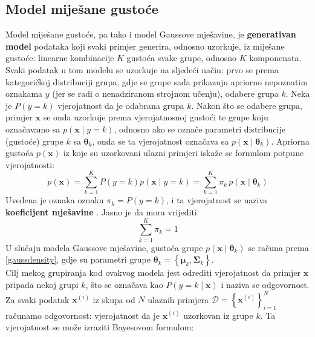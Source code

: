 \documentclass[times, utf8, zavrsni]{fer}
\begin{document}
\subsection{Model miješane gustoće}
Model miješane gustoće, pa tako i model Gaussove mješavine, je \textbf{generativan model} podataka koji svaki primjer generira, odnosno uzorkuje, iz miješane gustoće: linearne kombinacije $K$ gustoća svake grupe, odnosno $K$ komponenata. Svaki podatak u tom modelu se uzorkuje na sljedeći način: prvo se prema kategoričkoj distribuciji grupa, gdje se grupe sada prikazuju apriorno nepoznatim oznakama $y$ (jer se radi o nenadziranom strojnom učenju), odabere grupa $k$. Neka je $P \left(y = k\right)$ vjerojatnost da je odabrana grupa $k$. Nakon što se odabere grupa, primjer $\mathbf{x}$ se onda uzorkuje prema vjerojatnosnoj gustoći te grupe koju označavamo sa $p \left(\mathbf{x} \middle| y = k\right)$, odnosno ako se označe parametri distribucije (gustoće) grupe $k$ sa $\boldsymbol{\theta}_k$, onda se ta vjerojatnost označava sa $p \left(\mathbf{x} \middle| \boldsymbol{\theta}_k\right)$. Apriorna gustoća $p \left(\mathbf{x}\right)$ iz koje su uzorkovani ulazni primjeri iskaže se formulom potpune vjerojatnosti:
\begin{equation}
\label{mixdensity}
p \left(\mathbf{x}\right)
=
\sum_{k=1}^{K} P \left(y = k\right) p \left(\mathbf{x} \middle| y = k\right)
=
\sum_{k=1}^{K} \pi_k \, p \left(\mathbf{x} \middle| \boldsymbol{\theta}_k\right)
\end{equation}
Uvedena je oznaka oznaku $\pi_k = P \left(y = k\right)$, i ta vjerojatnost se naziva \textbf{koeficijent mješavine} . Jasno je da mora vrijediti
\begin{equation}
\label{eq:summixture}
    \sum_{k=1}^{K} \pi_k = 1
\end{equation}
U slučaju modela Gaussove mješavine, gustoća grupe $p \left(\mathbf{x} \middle| \boldsymbol{\theta}_k\right)$ se računa prema \ref{gaussdensity}, gdje su parametri grupe
$\boldsymbol{\theta}_k = \left\{
    \boldsymbol{\mu}_k, \boldsymbol{\Sigma}_k
\right\}$.\\
Cilj mekog grupiranja kod ovakvog modela jest odrediti vjerojatnost da primjer $\mathbf{x}$ pripada nekoj grupi $k$, što se označava kao $P \left(y = k \middle| \mathbf{x}\right)$ i naziva se odgovornost. Za svaki podatak $\mathbf{x}^{(i)}$ iz skupa od $N$ ulaznih primjera $\mathcal{D} = \left\{\mathbf{x}^{(i)}\right\}_{i=1}^{N}$ računamo odgovornost: vjerojatnost da je $\mathbf{x}^{(i)}$ uzorkovan iz grupe $k$. Ta vjerojatnost se može izraziti Bayesovom formulom:
\end{document}
